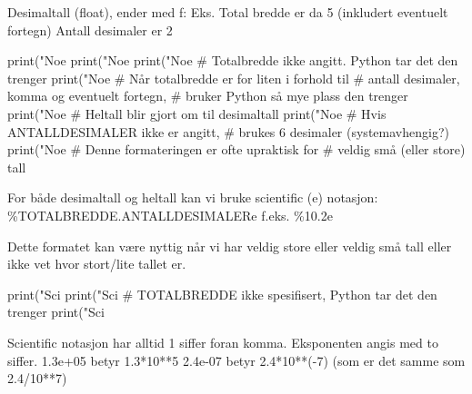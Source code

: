 Desimaltall (float), ender med f:  %
Eks. %
  Total bredde er da 5 (inkludert eventuelt fortegn)
  Antall desimaler er 2

\begin{usncodebox}

print("Noe %
print("Noe %
print("Noe %
                                     # Totalbredde ikke angitt. Python tar det den trenger
print("Noe %
                                     # Når totalbredde er for liten i forhold til 
                                     # antall desimaler, komma og eventuelt fortegn, 
                                     # bruker Python så mye plass den trenger
print("Noe %
                                     # Heltall blir gjort om til desimaltall
print("Noe %
                                     # Hvis ANTALLDESIMALER ikke er angitt, 
                                     # brukes 6 desimaler (systemavhengig?) 
print("Noe %
                                     # Denne formateringen er ofte upraktisk for 
                                     # veldig små (eller store) tall
\end{usncodebox}

For både desimaltall og heltall kan vi bruke scientific (e) notasjon: 
\%TOTALBREDDE.ANTALLDESIMALERe   f.eks. \%10.2e
 
Dette formatet kan være nyttig når vi har veldig store eller veldig små tall eller ikke vet hvor stort/lite tallet er. 

\begin{usncodebox}
print("Sci %
print("Sci %
                                         # TOTALBREDDE ikke spesifisert, Python tar det den trenger
print("Sci %
\end{usncodebox}

Scientific notasjon har alltid 1 siffer foran komma. Eksponenten angis med to siffer.
1.3e+05 betyr 1.3*10**5
2.4e-07 betyr 2.4*10**(-7)   (som er det samme som 2.4/10**7)

